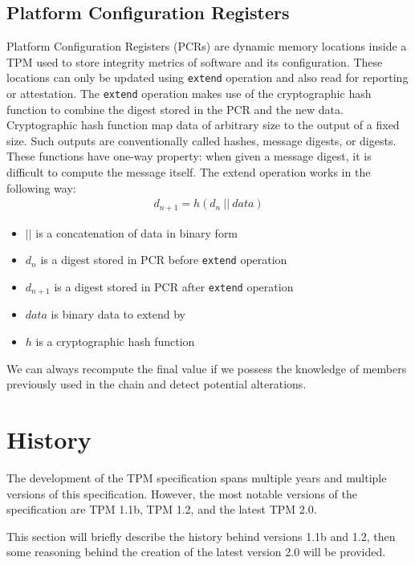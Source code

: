 \subsection{Platform Configuration Registers}\label{sec:pcr}
Platform Configuration Registers (PCRs) are dynamic memory locations inside a TPM used to store integrity metrics of software and its configuration. These locations can only be updated using \texttt{extend} operation and also read for reporting or attestation. The \texttt{extend} operation makes use of the cryptographic hash function to combine the digest stored in the PCR and the new data. Cryptographic hash function map data of arbitrary size to the output of a fixed size. Such outputs are conventionally called hashes, message digests, or digests. These functions have one-way property: when given a message digest, it is difficult  to compute the message itself. The extend operation works in the following way:
\begin{align*}
    d_{n+1} = h(d_{n}\ ||\ data)
\end{align*}
\begin{itemize}
    \item $||$ is a concatenation of data in binary form
    \item $ d_{n} $ is a digest stored in PCR before \texttt{extend} operation
    \item $ d_{n+1} $ is a digest stored in PCR after \texttt{extend} operation
    \item $ data $ is binary data to extend by
    \item $ h $ is a cryptographic hash function
\end{itemize}

We can always recompute the final value if we possess the knowledge of members previously used in the chain and detect potential alterations.


\section{History}
The development of the TPM specification spans multiple years and multiple versions of this specification. However, the most notable versions of the specification are TPM 1.1b, TPM 1.2, and the latest TPM 2.0. 

This section will briefly describe the history behind versions 1.1b and 1.2, then some reasoning behind the creation of the latest version 2.0 will be provided.

